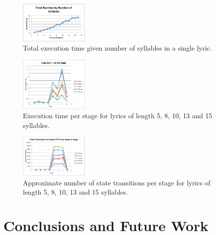 \documentclass{vgtc}                          %
\begin{document}
\begin{figure}[t]
\centering
\includegraphics[width=0.3\textwidth]{images/pdf/runtime_by_syllables.pdf}
\caption{Total execution time given number of syllables in a single lyric.}
\label{fig:perf1}
\end{figure}

\begin{figure}[t]
\centering
\includegraphics[width=0.3\textwidth]{images/pdf/runtime_per_stage.pdf}
\caption{Execution time per stage for lyrics of length 5, 8, 10, 13 and 15 syllables.}
\label{fig:perf2}
\end{figure}

\begin{figure}[t]
\centering
\includegraphics[width=0.3\textwidth]{images/pdf/transitions_per_stage.pdf}
\caption{Approximate number of state transitions per stage for lyrics of length 5, 8, 10, 13 and 15 syllables.}
\label{fig:perf3}
\end{figure}


\section{Conclusions and Future Work}
\end{document}
